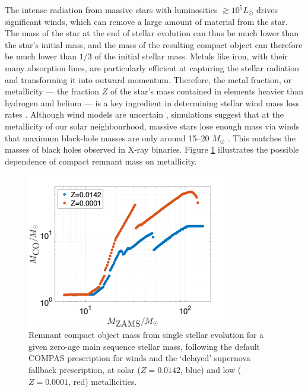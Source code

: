 \documentclass[review]{elsarticle}
\begin{document}
The intense radiation from massive stars with luminosities $\gtrsim 10^5 L_\odot$ drives significant winds, which can remove a large amount of material from the star. The mass of the star at the end of stellar evolution can thus be much lower than the star's initial mass, and the mass of the resulting compact object can therefore be much lower than $1/3$ of the initial stellar mass. Metals like iron, with their many absorption lines, are particularly efficient at capturing the stellar radiation and transforming it into outward momentum.  Therefore, the metal fraction, or metallicity  --- the fraction $Z$ of the star's mass contained in elements heavier than hydrogen and helium --- is a key ingredient in determining stellar wind mass loss rates \citep{Vink:2001,Sander:2020}. Although wind models are uncertain \citep[e.g.,][]{Renzo:2017,Vink:2017}, simulations suggest that at the metallicity of our solar neighbourhood, massive stars lose enough mass via winds that maximum black-hole masses are only around 15--20 $M_\odot$ \citep{Belczynski:2009,Spera:2015}. This matches the masses of black holes observed in X-ray binaries. Figure \ref{fig:BHremnant} illustrates the possible dependence of compact remnant mass on metallicity. 
 
\begin{figure}
	\centering
	\includegraphics[width=0.8\textwidth]{BHremnantdelayed.png}
	\caption{\label{fig:BHremnant} Remnant compact object mass from single stellar evolution for a given zero-age main sequence stellar mass, following the default COMPAS prescription for winds \citep{COMPAS:2021}  and the `delayed' \citet{Fryer:2012} supernova fallback prescription, at solar  ($Z=0.0142$, blue) and low ($Z=0.0001$, red) metallicities.  
	} 
\end{figure}
\end{document}
